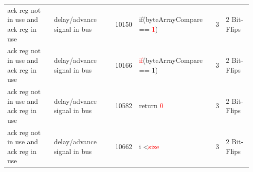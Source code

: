 \begin{table}[htbp]
{\begin{tabular}{llllll}
ack reg not in use and ack reg in use & delay/advance signal in bus & 10150 & if(byteArrayCompare == \textcolor{red}{1}) & 3 & 2 Bit-Flips \\ 
ack reg not in use and ack reg in use & delay/advance signal in bus & 10166 & \textcolor{red}{if}(byteArrayCompare == 1) & 3 & 2 Bit-Flips \\
ack reg not in use and ack reg in use & delay/advance signal in bus & 10582 & return \textcolor{red}{0} & 3 & 2 Bit-Flips \\ 
ack reg not in use and ack reg in use & delay/advance signal in bus & 10662 & i \textless \textcolor{red}{size} & 3 & 2 Bit-Flips \\ 
\bottomrule 
\end{tabular} 
}
\end{table}


